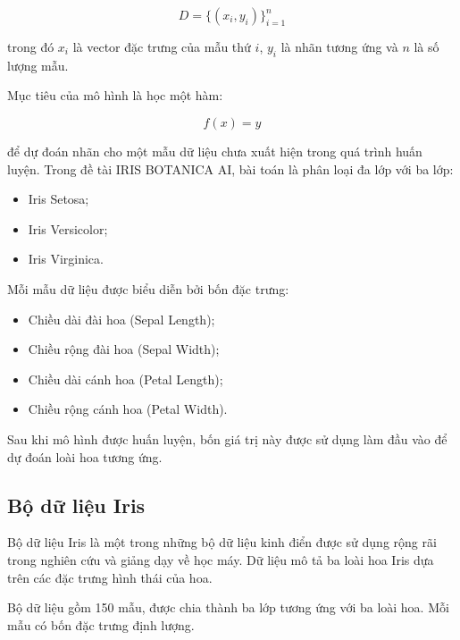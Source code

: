 \documentclass[14pt]{extarticle}
\begin{document}
		 \begin{equation*}
		 	D = \{(x_i,y_i)\}_{i=1}^{n}
		 \end{equation*}
		 
		 	\noindent trong đó $x_i$ là vector đặc trưng của mẫu thứ $i$, $y_i$ là nhãn tương ứng
		 và $n$ là số lượng mẫu.
		 
		\noindent Mục tiêu của mô hình là học một hàm:
		 
		 \begin{equation*}
		 	f(x) = y
		 \end{equation*}
		 
		 	\noindent để dự đoán nhãn cho một mẫu dữ liệu chưa xuất hiện trong quá trình huấn luyện. Trong đề tài IRIS BOTANICA AI, bài toán là phân loại đa lớp với ba lớp:
		 
		 \begin{itemize}
		 	\item Iris Setosa;
		 	\item Iris Versicolor;
		 	\item Iris Virginica.
		 \end{itemize}
		 
		 	\noindent Mỗi mẫu dữ liệu được biểu diễn bởi bốn đặc trưng:
		 
		 \begin{itemize}
		 	\item Chiều dài đài hoa (Sepal Length);
		 	\item Chiều rộng đài hoa (Sepal Width);
		 	\item Chiều dài cánh hoa (Petal Length);
		 	\item Chiều rộng cánh hoa (Petal Width).
		 \end{itemize}
		 
			\noindent Sau khi mô hình được huấn luyện, bốn giá trị này được sử dụng làm đầu vào để dự đoán loài hoa tương ứng.
			
		 \subsection{ Bộ dữ liệu Iris }
		 	\noindent Bộ dữ liệu Iris là một trong những bộ dữ liệu kinh điển được sử dụng rộng rãi trong nghiên cứu và giảng dạy về học máy. Dữ liệu mô tả ba loài hoa Iris dựa trên các đặc trưng hình thái của hoa.
		 
		 	\noindent Bộ dữ liệu gồm 150 mẫu, được chia thành ba lớp tương ứng với ba loài hoa. Mỗi mẫu có bốn đặc trưng định lượng.
		 
\end{document}
